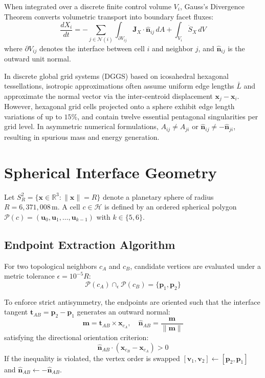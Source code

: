 \documentclass[twocolumn,10pt,amsmath,amssymb,aps,prl]{revtex4-2}
\begin{document}
When integrated over a discrete finite control volume $V_i$, Gauss's Divergence Theorem converts volumetric transport into boundary facet fluxes:
\begin{equation}
\frac{d X_i}{dt} = - \sum_{j \in \mathcal{N}(i)} \int_{\partial V_{ij}} \mathbf{J}_X \cdot \hat{\mathbf{n}}_{ij} \, dA + \int_{V_i} \dot{S}_X \, dV
\label{eq:fvm_integral}
\end{equation}
where $\partial V_{ij}$ denotes the interface between cell $i$ and neighbor $j$, and $\hat{\mathbf{n}}_{ij}$ is the outward unit normal.

In discrete global grid systems (DGGS) based on icosahedral hexagonal tessellations, isotropic approximations often assume uniform edge lengths $\bar{L}$ and approximate the normal vector via the inter-centroid displacement $\mathbf{x}_j - \mathbf{x}_i$. However, hexagonal grid cells projected onto a sphere exhibit edge length variations of up to $15\%$, and contain twelve essential pentagonal singularities per grid level. In asymmetric numerical formulations, $A_{ij} \neq A_{ji}$ or $\hat{\mathbf{n}}_{ij} \neq -\hat{\mathbf{n}}_{ji}$, resulting in spurious mass and energy generation.

\section{Spherical Interface Geometry}

Let $S_R^2 = \{ \mathbf{x} \in \mathbb{R}^3 : \|\mathbf{x}\| = R \}$ denote a planetary sphere of radius $R = 6,371,008\,\text{m}$. A cell $c \in \mathcal{H}$ is defined by an ordered spherical polygon $\mathcal{P}(c) = (\mathbf{u}_0, \mathbf{u}_1, \dots, \mathbf{u}_{k-1})$ with $k \in \{5, 6\}$.

\subsection{Endpoint Extraction Algorithm}
For two topological neighbors $c_A$ and $c_B$, candidate vertices are evaluated under a metric tolerance $\epsilon = 10^{-5} R$:
\begin{equation}
\mathcal{P}(c_A) \cap_{\epsilon} \mathcal{P}(c_B) = \{\mathbf{p}_1, \mathbf{p}_2\}
\end{equation}

To enforce strict antisymmetry, the endpoints are oriented such that the interface tangent $\mathbf{t}_{AB} = \mathbf{p}_2 - \mathbf{p}_1$ generates an outward normal:
\begin{equation}
\mathbf{m} = \mathbf{t}_{AB} \times \mathbf{x}_{c_A}, \quad \hat{\mathbf{n}}_{AB} = \frac{\mathbf{m}}{\|\mathbf{m}\|}
\end{equation}
satisfying the directional orientation criterion:
\begin{equation}
\hat{\mathbf{n}}_{AB} \cdot (\mathbf{x}_{c_B} - \mathbf{x}_{c_A}) > 0
\end{equation}
If the inequality is violated, the vertex order is swapped $[\mathbf{v}_1, \mathbf{v}_2] \leftarrow [\mathbf{p}_2, \mathbf{p}_1]$ and $\hat{\mathbf{n}}_{AB} \leftarrow -\hat{\mathbf{n}}_{AB}$.
\end{document}
